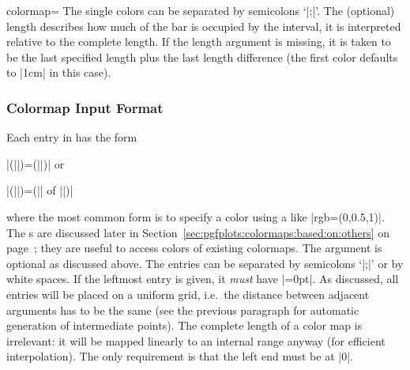 \begin{pgfplotskey}{colormap=}
\noindent The single colors can be separated by semicolons `|;|'. The (optional) length describes how much of the bar is occupied by the interval, it is interpreted relative to the complete length. If the length argument is missing, it is taken to be the last specified length plus the last length difference (the first color defaults to |1cm| in this case). 

\subsubsection{Colormap Input Format}
\label{sec:colormap:input:format}%
Each entry in  has the form 

	|(||)=(||)| or

	|(||)=(|| of ||)|

where the most common form is to specify a color using a  like |rgb=(0,0.5,1)|. The s are discussed later in Section~\ref{sec:pgfplots:colormaps:based:on:others} on page~\pageref{sec:pgfplots:colormaps:based:on:others}; they are useful to access colors of existing colormaps. The  argument is optional as discussed above. The entries can be separated by semicolons `|;|' or by white spaces. If the leftmost entry is given, it \emph{must} have |=0pt|. As discussed, all entries will be placed on a uniform grid, i.e.\ the distance between adjacent  arguments has to be the same (see the previous paragraph for automatic generation of intermediate points). 
The complete length of a color map is irrelevant: it will be mapped linearly to an internal range anyway (for efficient interpolation). The only requirement is that the left end must be at |0|.


\end{pgfplotskey}
